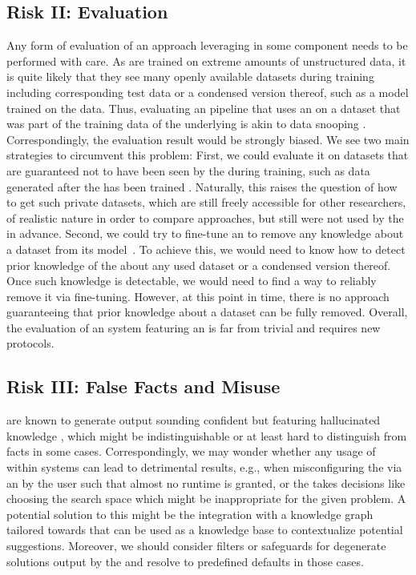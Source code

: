 \documentclass[10pt]{article} %
\begin{document}
\subsection{Risk II: Evaluation}
Any form of evaluation of an \AutoML approach leveraging \LLMs in some component needs to be performed with care. As \LLMs are trained on extreme amounts of unstructured data, it is quite likely that they see many openly available \ML datasets during training including corresponding test data or a condensed version thereof, such as a model trained on the data. Thus, evaluating an \AutoML pipeline that uses an \LLM on a dataset that was part of the training data of the underlying \LLM is akin to data snooping \citep{kok-us1984}. Correspondingly, the evaluation result would be strongly biased. We see two main strategies to circumvent this problem: First, we could evaluate it on datasets that are guaranteed not to have been seen by the \LLM during training, such as data generated after the \LLM has been trained \citep{faggioli2023perspectives}. Naturally, this raises the question of how to get such private datasets, which are still freely accessible for other researchers, of realistic nature in order to compare approaches, but still were not used by the \LLM in advance. Second, we could try to fine-tune an \LLM to remove any knowledge about a dataset from its model~\citep{yang-arxiv22a}. To achieve this, we would need to know how to detect prior knowledge of the \LLMs about any used dataset or a condensed version thereof. Once such knowledge is detectable, we would need to find a way to reliably remove it via fine-tuning. However, at this point in time, there is no approach guaranteeing that prior knowledge about a dataset can be fully removed. Overall, the evaluation of an \AutoML system featuring an \LLM is far from trivial and requires new protocols.  

\subsection{Risk III: False Facts and Misuse}
\LLMs are known to generate output sounding confident but featuring hallucinated knowledge \citep{ji-acmcs23a}, which might be indistinguishable or at least hard to distinguish from facts in some cases. Correspondingly, we may wonder whether any usage of \LLMs within \AutoML systems can lead to detrimental results, e.g., when misconfiguring the \AutoML via an \LLM by the user such that almost no runtime is granted, or the \LLM takes decisions like choosing the search space which might be inappropriate for the given problem. 
A potential solution to this might be the integration with a knowledge graph \citep{hogan-acmcs22a} tailored towards \AutoML that can be used as a knowledge base to contextualize potential \LLM suggestions. Moreover, we should consider filters or safeguards for degenerate solutions output by the \LLM and resolve to predefined defaults in those cases.
\end{document}
